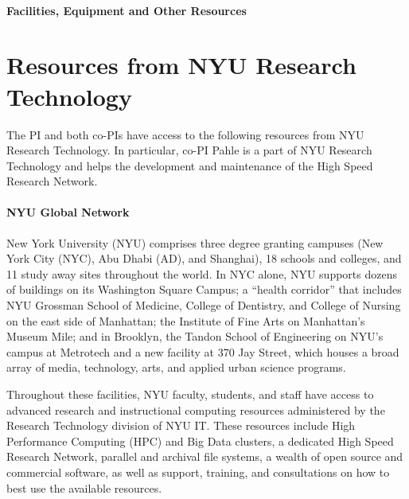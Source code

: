 \begin{center}
    {\large \bf \TITLE} \\
    {\bf Facilities, Equipment and Other Resources}
\end{center}



\section*{Resources from NYU Research Technology}

The PI and both co-PIs have access to the following resources from NYU Research Technology. In particular, co-PI Pahle is a part of NYU Research Technology and helps the development and maintenance of the High Speed Research Network.


\paragraph{NYU Global Network}
New York University (NYU) comprises three degree granting campuses (New York City (NYC), Abu Dhabi (AD), and Shanghai), 18 schools and colleges, and 11 study away sites throughout the world. In NYC alone, NYU supports dozens of buildings on its Washington Square Campus; a “health corridor” that includes NYU Grossman School of Medicine, College of Dentistry, and College of Nursing on the east side of Manhattan; the Institute of Fine Arts on Manhattan’s Museum Mile; and in Brooklyn, the Tandon School of Engineering on NYU’s campus at Metrotech and a new facility at 370 Jay Street, which houses a broad array of media, technology, arts, and applied urban science programs.

Throughout these facilities, NYU faculty, students, and staff have access to advanced research and instructional computing resources administered by the Research Technology division of NYU IT. These resources include High Performance Computing (HPC) and Big Data clusters, a dedicated High Speed Research Network, parallel and archival file systems, a wealth of open source and commercial software, as well as support, training, and consultations on how to best use the available resources.



